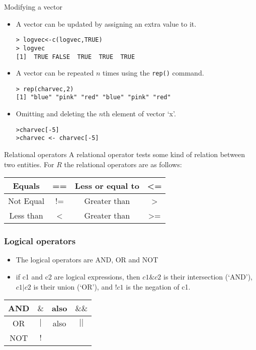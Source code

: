 \documentclass{beamer}
\begin{document}
\begin{frame}[fragile]{Modifying a vector}

\begin{itemize}
\item A vector can be updated by assigning an extra value to it.
\begin{verbatim}
> logvec<-c(logvec,TRUE)
> logvec
[1]  TRUE FALSE  TRUE  TRUE  TRUE
\end{verbatim}

\item A vector can be repeated $n$ times using the \texttt{rep()} command.
\begin{verbatim}
> rep(charvec,2)
[1] "blue" "pink" "red" "blue" "pink" "red"
\end{verbatim}

\item Omitting and deleting the $n$th element of vector `x'.
\begin{verbatim}
>charvec[-5]
>charvec <- charvec[-5]
\end{verbatim}

\end{itemize}
\end{frame}
\begin{frame}[fragile]{Relational operators}
A relational operator tests some kind of relation between two
entities. For $R$ the relational operators are as follows:
\begin{center}
\begin{tabular}{|c|c|c|c|}
  \hline

  Equals & == & Less or equal to  & <= \\
  \hline
  Not Equal & != & Greater than & > \\
  \hline
  Less than & < & Greater than & >= \\
  \hline
\end{tabular}
\end{center}
\end{frame}
\begin{frame}[fragile]
\frametitle{Logical operators}
\begin{itemize}
\item The logical operators are AND, OR and NOT

\item if c1 and c2 are logical expressions, then $c1 \& c2$ is
their intersection (`AND'), $c1 | c2$ is their union (`OR'), and
$!c1$ is the negation of c1.
\end{itemize}
\begin{center}
\begin{tabular}{|c|c|c|c|}
  \hline
  AND & $ \& $ & also  & $\&\&$ \\
  \hline
  OR & $|$ & also & $||$ \\
  \hline
  NOT & $!$ & &  \\
  \hline
\end{tabular}
\end{center}
\end{frame}
\end{document}
